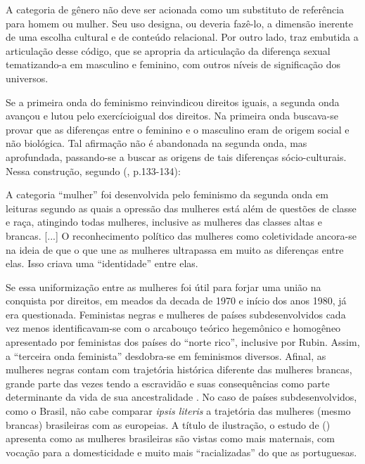 \begin{citacao}
A categoria de gênero não deve ser acionada como um substituto de referência para homem ou mulher. Seu uso designa, ou deveria fazê-lo, a dimensão inerente de uma escolha cultural e de conteúdo relacional. Por outro lado, traz embutida a articulação desse código, que se apropria da articulação da diferença sexual tematizando-a em masculino e feminino, com outros níveis de significação dos universos.
\end{citacao}

Se a primeira onda do feminismo reinvindicou direitos iguais, a segunda onda avançou e lutou pelo exercícioigual dos direitos. Na primeira onda buscava-se provar que as diferenças entre o feminino e o masculino eram de origem social e não biológica. Tal afirmação não é abandonada na segunda onda, mas aprofundada, passando-se a buscar as origens de tais diferenças sócio-culturais. Nessa construção, segundo  (\citeyear{PISCITELLI2009}, p.133-134):

\begin{citacao}
A categoria ``mulher'' foi desenvolvida pelo feminismo da segunda onda em leituras segundo as quais a opressão das mulheres está além de questões de classe e raça, atingindo todas mulheres, inclusive as mulheres das classes altas e brancas. [...] O reconhecimento político das mulheres como coletividade ancora-se na ideia de que o que une as mulheres ultrapassa em muito as diferenças entre elas. Isso criava uma ``identidade'' entre elas.
\end{citacao}

Se essa uniformização entre as mulheres foi útil para forjar uma união na conquista por direitos, em meados da decada de 1970 e início dos anos 1980, já era questionada. Feministas negras e mulheres de países subdesenvolvidos \cite{FURTADO2009} cada vez menos identificavam-se com o arcabouço teórico hegemônico e homogêneo apresentado por feministas dos países do ``norte rico'', inclusive por Rubin. Assim, a ``terceira onda feminista'' desdobra-se em feminismos diversos. Afinal, as mulheres negras contam com trajetória histórica diferente das mulheres brancas, grande parte das vezes tendo a escravidão e suas consequências como parte determinante da vida de sua ancestralidade \cite{HOOKS1990,CRENSHAW2002}. No caso de países subdesenvolvidos, como o Brasil, não cabe comparar \emph{ipsis literis} a trajetória das mulheres (mesmo brancas) brasileiras com as europeias. A título de ilustração, o estudo de  (\citeyear{PINTO2004}) apresenta como as mulheres brasileiras são vistas como mais maternais, com vocação para a domesticidade e muito mais ``racializadas'' do que as portuguesas.


